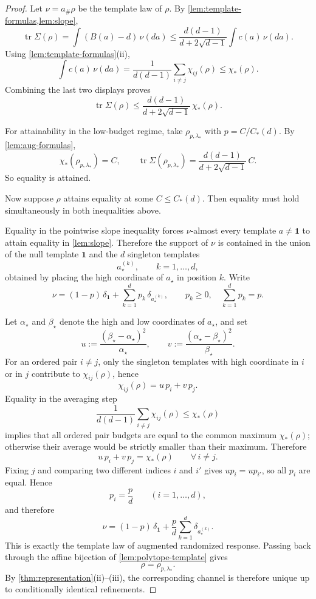\documentclass[11pt]{amsart}
\theoremstyle{definition}
\DeclareMathOperator{\tr}{tr}
\newcommand{\one}{\mathbf 1}
\begin{document}
\begin{proof}
Let $\nu=a_\#\rho$ be the template law of $\rho$. By \cref{lem:template-formulas,lem:slope},
\[
\tr\Sigma(\rho)=\int (B(a)-d)\,\nu(da)
\le \frac{d(d-1)}{d+2\sqrt{d-1}}\int c(a)\,\nu(da).
\]
Using \cref{lem:template-formulas}(ii),
\[
\int c(a)\,\nu(da)
=
\frac1{d(d-1)}\sum_{i\neq j}\chi_{ij}(\rho)
\le
\chi_*(\rho).
\]
Combining the last two displays proves
\[
\tr\Sigma(\rho)\le \frac{d(d-1)}{d+2\sqrt{d-1}}\,\chi_*(\rho).
\]

For attainability in the low-budget regime, take $\rho_{p,\lambda_*}$ with $p=C/C_*(d)$. By \cref{lem:aug-formulas},
\[
\chi_*(\rho_{p,\lambda_*})=C,
\qquad
\tr\Sigma(\rho_{p,\lambda_*})=\frac{d(d-1)}{d+2\sqrt{d-1}}\,C.
\]
So equality is attained.

Now suppose $\rho$ attains equality at some $C\le C_*(d)$. Then equality must hold simultaneously in both inequalities above.

Equality in the pointwise slope inequality forces $\nu$-almost every template $a\neq\one$ to attain equality in \cref{lem:slope}. Therefore the support of $\nu$ is contained in the union of the null template $\one$ and the $d$ singleton templates
\[
a_\star^{(k)},\qquad k=1,\dots,d,
\]
obtained by placing the high coordinate of $a_\star$ in position $k$. Write
\[
\nu=(1-p)\,\delta_{\one}+\sum_{k=1}^d p_k\,\delta_{a_\star^{(k)}},
\qquad
p_k\ge 0,\quad \sum_{k=1}^d p_k=p.
\]

Let $\alpha_\star$ and $\beta_\star$ denote the high and low coordinates of $a_\star$, and set
\[
u:=\frac{(\beta_\star-\alpha_\star)^2}{\alpha_\star},
\qquad
v:=\frac{(\alpha_\star-\beta_\star)^2}{\beta_\star}.
\]
For an ordered pair $i\neq j$, only the singleton templates with high coordinate in $i$ or in $j$ contribute to $\chi_{ij}(\rho)$, hence
\[
\chi_{ij}(\rho)=u\,p_i+v\,p_j.
\]
Equality in the averaging step
\[
\frac1{d(d-1)}\sum_{i\neq j}\chi_{ij}(\rho)\le \chi_*(\rho)
\]
implies that all ordered pair budgets are equal to the common maximum $\chi_*(\rho)$; otherwise their average would be strictly smaller than their maximum. Therefore
\[
u\,p_i+v\,p_j=\chi_*(\rho)\qquad \forall\, i\neq j.
\]
Fixing $j$ and comparing two different indices $i$ and $i'$ gives $u p_i=u p_{i'}$, so all $p_i$ are equal. Hence
\[
p_i=\frac{p}{d}\qquad (i=1,\dots,d),
\]
and therefore
\[
\nu=(1-p)\,\delta_{\one}+\frac{p}{d}\sum_{k=1}^d \delta_{a_\star^{(k)}}.
\]
This is exactly the template law of augmented randomized response. Passing back through the affine bijection of \cref{lem:polytope-template} gives
\[
\rho=\rho_{p,\lambda_*}.
\]
By \cref{thm:representation}(ii)--(iii), the corresponding channel is therefore unique up to conditionally identical refinements.
\end{proof}
\end{document}
